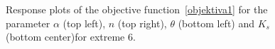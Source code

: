 \documentclass[review,times,3p,10pt]{elsarticle}
\begin{document}
\begin{figure}
\begin{center}

\caption{Response plots of the objective function~\eqref{objektiva1} for the parameter $\alpha$ (top left), $n$ (top right), $\theta$ (bottom left) and $K_s$ (bottom center)for extreme 6.}
\label{objfnc6}
\end{center}
\end{figure}
\end{document}
